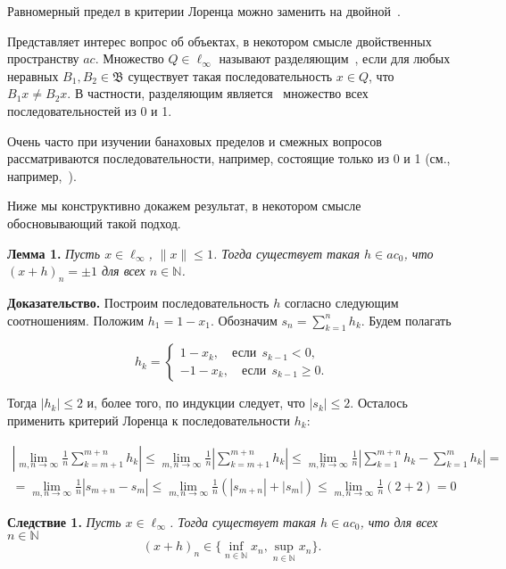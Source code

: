 \documentclass[a4paper,14pt]{article}
\begin{document}
Равномерный предел в критерии Лоренца можно заменить на двойной~\cite[Теорема 1]{zvol2022ac}.


Представляет интерес вопрос об объектах, в некотором смысле двойственных пространству $ac$.
Множество $Q\in\ell_\infty$ называют разделяющим~\cite[\S 3]{Semenov2014geomprops}, если
для любых неравных $B_1, B_2\in\mathfrak{B}$ существует такая последовательность $x\in Q$,
что $B_1 x \neq B_2 x$.
В частности, разделяющим является~\cite{semenov2010characteristic} множество всех последовательностей из 0 и 1.

Очень часто при изучении банаховых пределов и смежных вопросов
рассматриваются последовательности, например, состоящие только из 0 и 1
(см., например,~\cite{connor1990almost,our-mz2019ac0,avdeev2021vestnik,avdeev2021vmzprimes}).


Ниже мы конструктивно докажем результат,
в некотором смысле обосновывающий такой подход.


\medskip

\textbf{Лемма 1.}
{\sl
	Пусть $x\in\ell_\infty$, $\|x\|\leq 1$.
	Тогда существует такая $h\in ac_0$, что $(x+h)_n = \pm 1$ для всех $n\in\mathbb N$.
}

\textbf{Доказательство.}
Построим последовательность $h$ согласно следующим соотношениям.
Положим $h_1 = 1-x_1$.
Обозначим $s_n = \sum_{k=1}^n h_k$. Будем полагать

$$
	h_k = \begin{cases}
		1-x_k, \quad\mbox{если}~~ s_{k-1} < 0,
		\\
		-1 - x_k,\quad\mbox{если}~~ s_{k-1} \geq 0
		.
	\end{cases}
$$

Тогда $|h_k| \leq 2$ и, более того, по индукции следует, что $|s_k| \leq 2$. Осталось применить критерий Лоренца к последовательности $h_k$:

\begin{multline*}
	\left|\lim_{m,n\to \infty} \frac{1}{n} \sum_{k=m+1}^{m+n} h_k\right| \leq
	\lim_{m,n\to \infty} \frac{1}{n} \left|\sum_{k=m+1}^{m+n} h_k\right| \leq
	\lim_{m,n\to \infty} \frac{1}{n} \left|\sum_{k=1}^{m+n} h_k - \sum_{k=1}^{m} h_k  \right| =
	\\=
	\lim_{m,n\to \infty} \frac{1}{n} \left|s_{m+n} - s_{m}  \right| \leq
	\lim_{m,n\to \infty} \frac{1}{n} (|s_{m+n}| + |s_{m} |) \leq
	\lim_{m,n\to \infty} \frac{1}{n} (2 + 2) =0
\end{multline*}

\medskip

\textbf{Следствие 1.} {\sl
	Пусть $x\in\ell_\infty$.
	Тогда существует такая $h\in ac_0$, что для всех $n\in\mathbb N$
	\begin{equation*}
		(x+h)_n \in \{\inf_{n\in\mathbb N} x_n,\sup_{n\in\mathbb N} x_n\}
		.
	\end{equation*}
}
\end{document}
